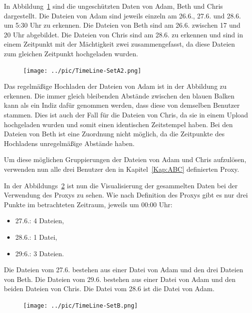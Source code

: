 \documentclass[
    fontsize=12pt,
    headings=small,
    parskip=half,           %
    bibliography=totoc,
    numbers=noenddot,       %
    open=any,               %
    ]{scrreprt}
\begin{document}
In Abbildung~\ref{fig:ungTime} sind die ungeschützten Daten von Adam, Beth und Chris dargestellt.
Die Dateien von Adam sind jeweils einzeln am 26.6., 27.6. und 28.6. um 5:30 Uhr zu erkennen.
Die Dateien von Beth sind am 26.6. zwischen 17 und 20 Uhr abgebildet.
Die Dateien von Chris sind am 28.6. zu erkennen und sind in einem Zeitpunkt mit der Mächtigkeit zwei zusammengefasst, da diese Dateien zum gleichen Zeitpunkt hochgeladen wurden.

\begin{figure}[H]
\texttt{[image: ../pic/TimeLine-SetA2.png]}
\label{fig:ungTime}
\end{figure}

Das regelmäßige Hochladen der Dateien von Adam ist in der Abbildung zu erkennen.
Die immer gleich bleibenden Abstände zwischen den blauen Balken kann als ein Indiz dafür genommen werden, dass diese von demselben Benutzer stammen.
Dies ist auch der Fall für die Dateien von Chris, da sie in einem Upload hochgeladen wurden und somit einen identischen Zeitstempel haben.
Bei den Dateien von Beth ist eine Zuordnung nicht möglich, da die Zeitpunkte des Hochladens unregelmäßige Abstände haben.

Um diese möglichen Gruppierungen der Dateien von Adam und Chris aufzulösen,
verwenden nun alle drei Benutzer den in Kapitel~\ref{Kap:ABC} definierten Proxy.

In der Abbildungs~\ref{fig:ProxyTime} ist nun die Visualisierung der gesammelten Daten bei der Verwendung des Proxys zu sehen.
Wie nach Definition des Proxys gibt es nur drei Punkte im betrachteten Zeitraum, jeweils um 00:00 Uhr:
\begin{itemize}
\item 27.6.: 4 Dateien,
\item 28.6.: 1 Datei,
\item 29:6.: 3 Dateien.
\end{itemize}
Die Dateien vom 27.6. bestehen aus einer Datei von Adam und den drei Dateien von Beth.
Die Dateien vom 29.6. bestehen aus einer Datei von Adam und den beiden Dateien von Chris.
Die Datei vom 28.6 ist die Datei von Adam.

\begin{figure}[H]
\texttt{[image: ../pic/TimeLine-SetB.png]}
\label{fig:ProxyTime}
\end{figure}
\end{document}
